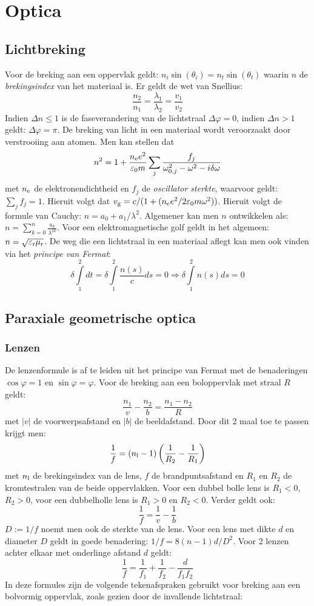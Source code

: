 \documentclass[twoside]{report}
\begin{document}
\chapter{Optica}
\section{Lichtbreking}
Voor de breking aan een oppervlak geldt: $n_i\sin(\theta_i)=n_t\sin(\theta_t)$
waarin $n$ de {\it brekingsindex} van het materiaal is. Er geldt de wet van
Snellius:
\[
\frac{n_2}{n_1}=\frac{\lambda_1}{\lambda_2}=\frac{v_1}{v_2}
\]
Indien $\Delta n\leq1$ is de faseverandering van de lichtstraal
$\Delta\varphi=0$, indien $\Delta n>1$ geldt: $\Delta\varphi=\pi$. De
breking van licht in een materiaal wordt veroorzaakt door verstrooiing
aan atomen. Men kan stellen dat
\[
n^2=1+\frac{n_{\rm e}e^2}{\varepsilon_0m}\sum_j\frac{f_j}{\omega_{0,j}^2-\omega^2-i\delta\omega}
\]
met $n_{\rm e}$ de elektronendichtheid en $f_j$ de {\it oscillator sterkte},
waarvoor geldt: $\sum\limits_j f_j=1$.
Hieruit volgt dat $v_{\rm g}=c/(1+(n_{\rm e}e^2/2\varepsilon_0m\omega^2))$.
Hieruit volgt de formule van Cauchy: $n=a_0+a_1/\lambda^2$. Algemener kan men
$n$ ontwikkelen als: $\displaystyle n=\sum_{k=0}^n\frac{a_k}{\lambda^{2k}}$.
\npar
Voor een elektromagnetische golf geldt in het algemeen:
$n=\sqrt{\varepsilon_{\rm r}\mu_{\rm r}}$.
\npar
De weg die een lichtstraal in een materiaal aflegt kan men ook vinden via
het {\it principe van Fermat}:
\[
\delta\int\limits_1^2 dt=\delta\int\limits_1^2\frac{n(s)}{c}ds=0\Rightarrow
\delta\int\limits_1^2 n(s)ds=0
\]

\section{Paraxiale geometrische optica}
\subsection{Lenzen}
De lenzenformule is af te leiden uit het principe van Fermat met de
benaderingen $\cos\varphi=1$ en $\sin\varphi=\varphi$. Voor de breking aan
een boloppervlak met straal $R$ geldt:
\[
\frac{n_1}{v}-\frac{n_2}{b}=\frac{n_1-n_2}{R}
\]
met $|v|$ de voorwerpsafstand en $|b|$ de beeldafstand. Door dit 2 maal toe
te passen krijgt men:
\[
\frac{1}{f}=(n_{\rm l}-1)\left(\frac{1}{R_2}-\frac{1}{R_1}\right)
\]
met $n_{\rm l}$ de brekingsindex van de lens, $f$ de brandpuntsafstand en
$R_1$ en $R_2$ de kromtestralen van de beide oppervlakken. Voor een dubbel
bolle lens is $R_1<0$, $R_2>0$, voor een dubbelholle lens is $R_1>0$ en
$R_2<0$. Verder geldt ook:
\[
\frac{1}{f}=\frac{1}{v}-\frac{1}{b}
\]
$D:=1/f$ noemt men ook de sterkte van de lens. Voor een lens met dikte $d$ en
diameter $D$ geldt in goede benadering: $1/f=8(n-1)d/D^2$. Voor 2 lenzen
achter elkaar met onderlinge afstand $d$ geldt:
\[
\frac{1}{f}=\frac{1}{f_1}+\frac{1}{f_2}-\frac{d}{f_1f_2}
\]
In deze formules zijn de volgende tekenafspraken gebruikt voor breking aan
een bolvormig oppervlak, zoals gezien door de invallende lichtstraal:
\end{document}

